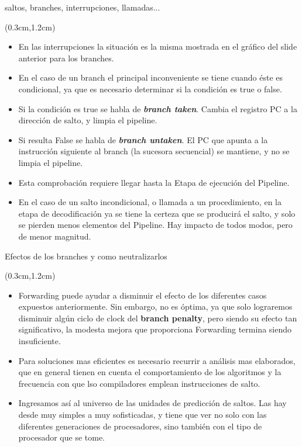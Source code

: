 \documentclass[table,dvipsnames,aspectratio=169]{beamer}
\begin{document}
\begin{frame}{saltos, branches, interrupciones, llamadas...}
 \begin{textblock*}{\textwidth}(0.3cm,1.2cm)
  \begin{itemize} [<+(1)->] \justifying \parskip .1cm
   \item En las interrupciones la situación es la misma mostrada en el gráfico del slide anterior para los branches.
   \item En el caso de un branch el principal inconveniente se tiene cuando éste es condicional, ya que es necesario determinar si la condición es true o false.
   \item Si la condición es true se habla de \textbf{\textit{\color{blue}branch taken}}. Cambia el registro PC a la dirección de salto, y limpia el pipeline.
   \item Si resulta False se habla de \textbf{\textit{\color{blue}branch untaken}}. El PC que apunta a la instrucción siguiente al branch (la sucesora secuencial) se mantiene, y no se limpia el pipeline.
   \item Esta comprobación requiere llegar hasta la Etapa de ejecución del Pipeline.
   \item En el caso de un salto incondicional, o llamada a un procedimiento, en la etapa de decodificación ya se tiene la certeza que se producirá el salto, y solo se pierden menos elementos del Pipeline. Hay impacto de todos modos, pero de menor magnitud.
  \end{itemize}
 \end{textblock*}
\end{frame}
 
\begin{frame}{Efectos de los branches y como neutralizarlos}
 \begin{textblock*}{\textwidth}(0.3cm,1.2cm)
  \begin{itemize}[<+(1)->]\justifying \parskip 0.3cm
   \item Forwarding puede ayudar a disminuir el efecto de los diferentes casos expuestos anteriormente. Sin embargo, no es óptima, ya que solo lograremos disminuir algún ciclo de clock del \textbf{\color{blue}branch penalty}, pero siendo su efecto tan significativo, la modesta mejora que proporciona Forwarding termina siendo insuficiente.
   \item Para soluciones mas eficientes es necesario recurrir a análisis mas elaborados, que en general tienen en cuenta el comportamiento de los algoritmos y la frecuencia con que lso compiladores emplean instrucciones de salto.
   \item Ingresamos así al universo de las unidades de predicción de saltos. Las hay desde muy simples a muy sofisticadas, y tiene que ver no solo con las diferentes generaciones de procesadores, sino también con el tipo de procesador que se tome.
  \end{itemize}
 \end{textblock*}
\end{frame}
\end{document}
